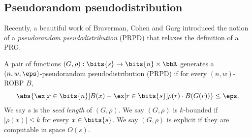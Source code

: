 \subsection{Pseudorandom pseudodistribution }
Recently, a beautiful work of Braverman, Cohen and Garg \cite{BCG18} introduced the notion of a \emph{pseudorandom pseudodistribution} (PRPD)  that relaxes the definition of a PRG.
\begin{definition}
A pair of functions $(G,\rho):\bits{s}\to \bits{n}\times \bbR$ generates a $(n,w,\eps)$-pseudorandom pseudodistribution (PRPD) if for every $(n,w)$-ROBP $B$,
$$\abs{\ex[x\in\bits{n}]{B(x)}-\ex[r\in\bits{s}]{\rho(r)\cdot B(G(r))}}\le\eps.$$
We say $s$ is the \emph{seed length} of $(G,\rho)$. We say $(G,\rho)$ is $k$-bounded if $|\rho(x)|\le k$ for every $x\in\bits{s}$. We say $(G,\rho)$ is explicit if they are computable in space $O(s)$.
\end{definition}
